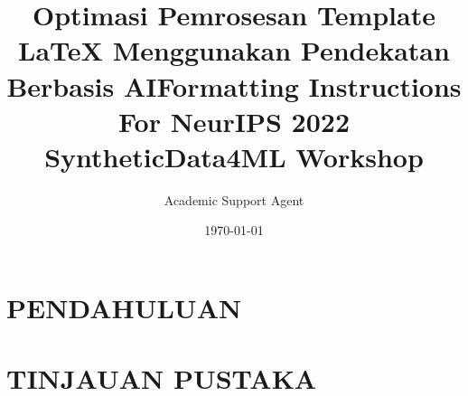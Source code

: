 \documentclass{article}
\title{Optimasi Pemrosesan Template LaTeX Menggunakan Pendekatan Berbasis AI}
\author{Academic Support Agent}
\date{\today}
\begin{document}
\maketitle

\begin{abstract}

\end{abstract}

\chapter{PENDAHULUAN}


\chapter{TINJAUAN PUSTAKA}








    \usepackage[nonatbib]{neurips_2022}

\usepackage[utf8]{inputenc} %
\usepackage[T1]{fontenc}    %
\usepackage{hyperref}       %
\usepackage{url}            %
\usepackage{booktabs}       %
\usepackage{amsfonts}       %
\usepackage{nicefrac}       %
\usepackage{microtype}      %
\usepackage{xcolor}         %

\title{Formatting Instructions For NeurIPS 2022 \\ SyntheticData4ML Workshop}

%
\end{document}

